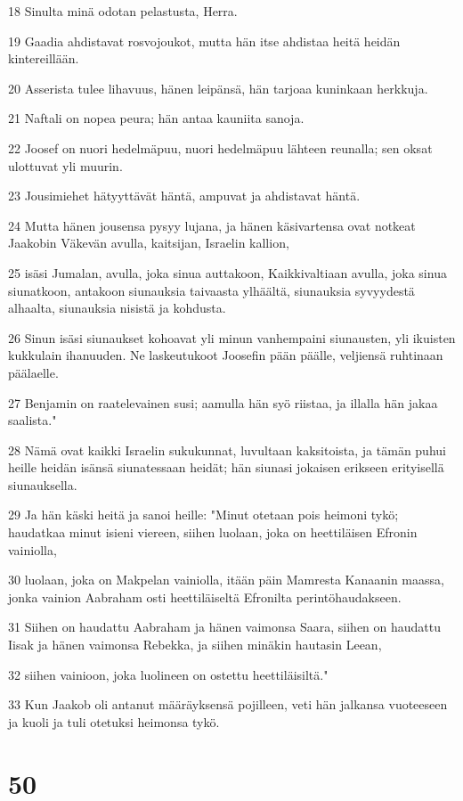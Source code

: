 \par 18 Sinulta minä odotan pelastusta, Herra.
\par 19 Gaadia ahdistavat rosvojoukot, mutta hän itse ahdistaa heitä heidän kintereillään.
\par 20 Asserista tulee lihavuus, hänen leipänsä, hän tarjoaa kuninkaan herkkuja.
\par 21 Naftali on nopea peura; hän antaa kauniita sanoja.
\par 22 Joosef on nuori hedelmäpuu, nuori hedelmäpuu lähteen reunalla; sen oksat ulottuvat yli muurin.
\par 23 Jousimiehet hätyyttävät häntä, ampuvat ja ahdistavat häntä.
\par 24 Mutta hänen jousensa pysyy lujana, ja hänen käsivartensa ovat notkeat Jaakobin Väkevän avulla, kaitsijan, Israelin kallion,
\par 25 isäsi Jumalan, avulla, joka sinua auttakoon, Kaikkivaltiaan avulla, joka sinua siunatkoon, antakoon siunauksia taivaasta ylhäältä, siunauksia syvyydestä alhaalta, siunauksia nisistä ja kohdusta.
\par 26 Sinun isäsi siunaukset kohoavat yli minun vanhempaini siunausten, yli ikuisten kukkulain ihanuuden. Ne laskeutukoot Joosefin pään päälle, veljiensä ruhtinaan päälaelle.
\par 27 Benjamin on raatelevainen susi; aamulla hän syö riistaa, ja illalla hän jakaa saalista."
\par 28 Nämä ovat kaikki Israelin sukukunnat, luvultaan kaksitoista, ja tämän puhui heille heidän isänsä siunatessaan heidät; hän siunasi jokaisen erikseen erityisellä siunauksella.
\par 29 Ja hän käski heitä ja sanoi heille: "Minut otetaan pois heimoni tykö; haudatkaa minut isieni viereen, siihen luolaan, joka on heettiläisen Efronin vainiolla,
\par 30 luolaan, joka on Makpelan vainiolla, itään päin Mamresta Kanaanin maassa, jonka vainion Aabraham osti heettiläiseltä Efronilta perintöhaudakseen.
\par 31 Siihen on haudattu Aabraham ja hänen vaimonsa Saara, siihen on haudattu Iisak ja hänen vaimonsa Rebekka, ja siihen minäkin hautasin Leean,
\par 32 siihen vainioon, joka luolineen on ostettu heettiläisiltä."
\par 33 Kun Jaakob oli antanut määräyksensä pojilleen, veti hän jalkansa vuoteeseen ja kuoli ja tuli otetuksi heimonsa tykö.

\chapter{50}

